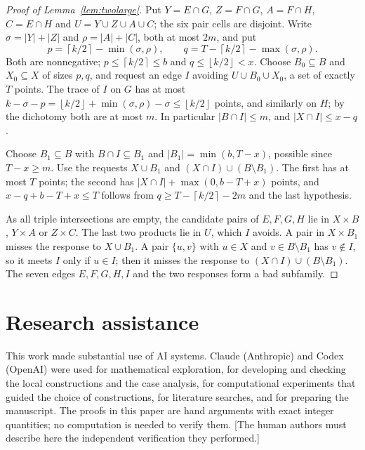 \documentclass[11pt]{article}
\numberwithin{equation}{section}
\theoremstyle{definition}
\theoremstyle{remark}
\newcommand{\ceil}[1]{\left\lceil #1\right\rceil}
\newcommand{\floor}[1]{\left\lfloor #1\right\rfloor}
\begin{document}
\begin{proof}[Proof of Lemma~\ref{lem:twolarge}]
Put $Y=E\cap G$, $Z=F\cap G$, $A=F\cap H$, $C=E\cap H$ and
$U=Y\cup Z\cup A\cup C$; the six pair cells are disjoint. Write
$\sigma=|Y|+|Z|$ and $\rho=|A|+|C|$, both at most $2m$, and put
\[
 p=\ceil{k/2}-\min(\sigma,\rho),\qquad q=T-\ceil{k/2}-\max(\sigma,\rho).
\]
Both are nonnegative; $p\le\ceil{k/2}\le b$ and $q\le\floor{k/2}<x$.
Choose $B_0\subseteq B$ and $X_0\subseteq X$ of sizes $p,q$, and request
an edge $I$ avoiding $U\cup B_0\cup X_0$, a set of exactly $T$ points.
The trace of $I$ on $G$ has at most
$k-\sigma-p=\floor{k/2}+\min(\sigma,\rho)-\sigma\le\floor{k/2}$ points,
and similarly on $H$; by the dichotomy both are at most $m$. In
particular $|B\cap I|\le m$, and $|X\cap I|\le x-q$.

Choose $B_1\subseteq B$ with $B\cap I\subseteq B_1$ and
$|B_1|=\min(b,T-x)$, possible since $T-x\ge m$. Use the requests
$X\cup B_1$ and $(X\cap I)\cup(B\setminus B_1)$. The first has at most $T$
points; the second has $|X\cap I|+\max(0,b-T+x)$ points, and
$x-q+b-T+x\le T$ follows from $q\ge T-\ceil{k/2}-2m$ and the last
hypothesis.

As all triple intersections are empty, the candidate pairs of
$E,F,G,H$ lie in $X\times B$, $Y\times A$ or $Z\times C$. The last two
products lie in $U$, which $I$ avoids. A pair in $X\times B_1$ misses the
response to $X\cup B_1$. A pair $\{u,v\}$ with $u\in X$ and
$v\in B\setminus B_1$ has $v\notin I$, so it meets $I$ only if $u\in I$;
then it misses the response to $(X\cap I)\cup(B\setminus B_1)$. The seven
edges $E,F,G,H,I$ and the two responses form a bad subfamily.
\end{proof}

\section*{Research assistance}
This work made substantial use of AI systems. Claude (Anthropic) and
Codex (OpenAI) were used for mathematical exploration, for developing
and checking the local constructions and the case analysis, for
computational experiments that guided the choice of constructions, for
literature searches, and for preparing the manuscript. The proofs in
this paper are hand arguments with exact integer quantities; no
computation is needed to verify them. [The human authors must describe
here the independent verification they performed.]
\end{document}
